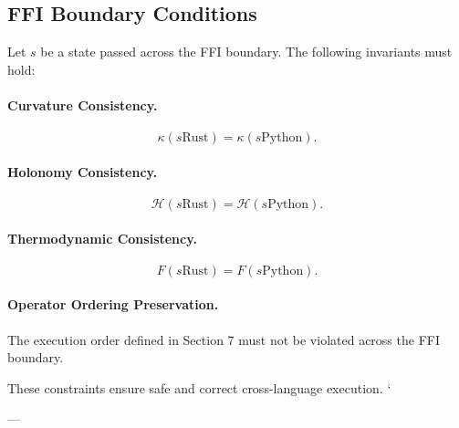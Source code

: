 \subsection{FFI Boundary Conditions}

Let $s$ be a state passed across the FFI boundary. The following invariants must
hold:

\paragraph{Curvature Consistency.}
\[
\kappa(s{\text{Rust}}) = \kappa(s{\text{Python}}).
\]

\paragraph{Holonomy Consistency.}
\[
\mathcal{H}(s{\text{Rust}}) = \mathcal{H}(s{\text{Python}}).
\]

\paragraph{Thermodynamic Consistency.}
\[
F(s{\text{Rust}}) = F(s{\text{Python}}).
\]

\paragraph{Operator Ordering Preservation.}
The execution order defined in Section 7 must not be violated across the FFI
boundary.

These constraints ensure safe and correct cross-language execution.
`

---

